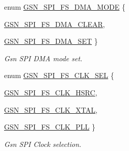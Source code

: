 \begin{DoxyCompactItemize}
enum \hyperlink{a00655_ga527bb8ce76fef8354e9db5ed16509e26}{GSN\_\-SPI\_\-FS\_\-DMA\_\-MODE} \{ \par
\hyperlink{a00655_gga527bb8ce76fef8354e9db5ed16509e26a0de7099704e5c861c316a36560d6143d}{GSN\_\-SPI\_\-FS\_\-DMA\_\-CLEAR}, 
\par
\hyperlink{a00655_gga527bb8ce76fef8354e9db5ed16509e26aeb323e7a43a2feafa7d2654997d9291d}{GSN\_\-SPI\_\-FS\_\-DMA\_\-SET}
 \}
\begin{DoxyCompactList}\small\item\em Gsn SPI DMA mode set. \end{DoxyCompactList}\item 
enum \hyperlink{a00655_ga19874fb33d92ef82cb6a517ba6c1a5fa}{GSN\_\-SPI\_\-FS\_\-CLK\_\-SEL} \{ \par
\hyperlink{a00655_gga19874fb33d92ef82cb6a517ba6c1a5faacc5c98717a8aeb83de93e0b25c489bad}{GSN\_\-SPI\_\-FS\_\-CLK\_\-HSRC}, 
\par
\hyperlink{a00655_gga19874fb33d92ef82cb6a517ba6c1a5faadc9477dfa579313fc3c66e6fb1e7b831}{GSN\_\-SPI\_\-FS\_\-CLK\_\-XTAL}, 
\par
\hyperlink{a00655_gga19874fb33d92ef82cb6a517ba6c1a5faadeae39953a2fe0202f1c5357faccbe3d}{GSN\_\-SPI\_\-FS\_\-CLK\_\-PLL}
 \}
\begin{DoxyCompactList}\small\item\em Gsn SPI Clock selection. \end{DoxyCompactList}\end{DoxyCompactItemize}
